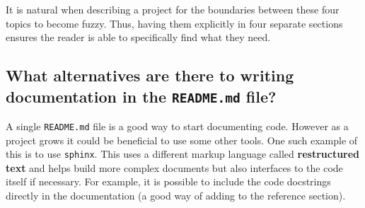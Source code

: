 It is natural when describing a project for the boundaries between these four
topics to become fuzzy. Thus, having them explicitly in four separate sections
ensures the reader is able to specifically find what they need.

\subsection{What alternatives are there to writing documentation in the \texttt{README.md} file?}

A single \texttt{README.md} file is a good way to start documenting code. However as a
project grows it could be beneficial to use some other tools. One such example
of this is to use \texttt{sphinx}. This uses a
different markup language called \textbf{restructured text}
 and helps build more complex
documents but also interfaces to the code itself if necessary. For example, it
is possible to include the code docstrings directly in the documentation (a good
way of adding to the reference section).
